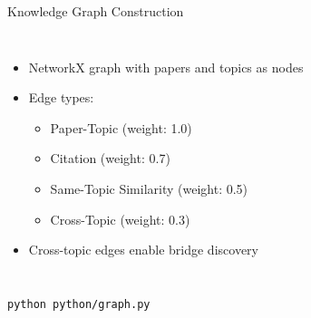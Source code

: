 \documentclass{beamer}
\begin{document}
\begin{frame}{Knowledge Graph Construction}
    \begin{columns}
        \begin{itemize}
            \item NetworkX graph with papers and topics as nodes
            \item Edge types:
            \begin{itemize}
                \item Paper-Topic (weight: 1.0)
                \item Citation (weight: 0.7)
                \item Same-Topic Similarity (weight: 0.5)
                \item Cross-Topic (weight: 0.3)
            \end{itemize}
            \item Cross-topic edges enable bridge discovery
        \end{itemize}
        
        \begin{center}
        \end{center}
    \end{columns}
    
    \begin{lstlisting}[basicstyle=\tiny\ttfamily]
    python python/graph.py
    \end{lstlisting}
\end{frame}
\end{document}
